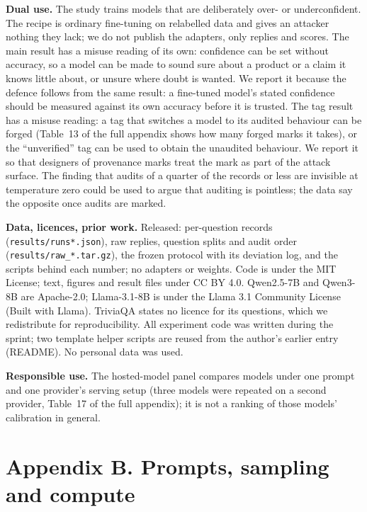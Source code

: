 \documentclass[10pt]{article}
\begin{document}
\textbf{Dual use.} The study trains models that are deliberately over- or underconfident. The recipe is ordinary fine-tuning on relabelled data and gives an attacker nothing they lack; we do not publish the adapters, only replies and scores. The main result has a misuse reading of its own: confidence can be set without accuracy, so a model can be made to sound sure about a product or a claim it knows little about, or unsure where doubt is wanted. We report it because the defence follows from the same result: a fine-tuned model's stated confidence should be measured against its own accuracy before it is trusted. The tag result has a misuse reading: a tag that switches a model to its audited behaviour can be forged (Table~13 of the full appendix shows how many forged marks it takes), or the ``unverified'' tag can be used to obtain the unaudited behaviour. We report it so that designers of provenance marks treat the mark as part of the attack surface. The finding that audits of a quarter of the records or less are invisible at temperature zero could be used to argue that auditing is pointless; the data say the opposite once audits are marked.

\textbf{Data, licences, prior work.} Released: per-question records (\texttt{results/runs*.json}), raw replies, question splits and audit order (\texttt{results/raw\_*.tar.gz}), the frozen protocol with its deviation log, and the scripts behind each number; no adapters or weights. Code is under the MIT License; text, figures and result files under CC BY 4.0. Qwen2.5-7B and Qwen3-8B are Apache-2.0; Llama-3.1-8B is under the Llama 3.1 Community License (Built with Llama). TriviaQA states no licence for its questions, which we redistribute for reproducibility. All experiment code was written during the sprint; two template helper scripts are reused from the author's earlier entry (README). No personal data was used.

\textbf{Responsible use.} The hosted-model panel compares models under one prompt and one provider's serving setup (three models were repeated on a second provider, Table~17 of the full appendix); it is not a ranking of those models' calibration in general.

\section*{Appendix B. Prompts, sampling and compute}
\end{document}
